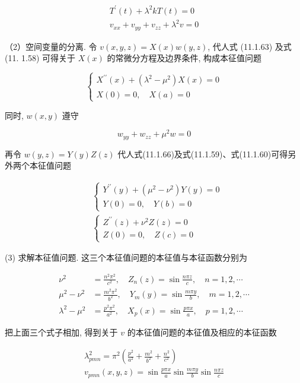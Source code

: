 $$
\begin{gathered}
T^{\prime}(t)+\lambda^{2} k T(t)=0 \\
v_{x x}+v_{y y}+v_{z z}+\lambda^{2} v=0
\end{gathered}
$$

（2）空间变量的分离. 令 $v(x, y, z)=X(x) w(y, z)$, 代人式 (11.1.63) 及式 (11. 1.58) 可得关于 $X(x)$ 的常微分方程及边界条件, 构成本征值问题

$$
\left\{\begin{array}{l}
X^{\prime \prime}(x)+\left(\lambda^{2}-\mu^{2}\right) X(x)=0 \\
X(0)=0, \quad X(a)=0
\end{array}\right.
$$

同时, $w(x, y)$ 遵守

$$
w_{y y}+w_{z z}+\mu^{2} w=0
$$

再令 $w(y, z)=Y(y) Z(z)$ 代人式(11.1.66)及式(11.1.59)、式(11.1.60)可得另外两个本征值问题

$$
\begin{aligned}
& \left\{\begin{array}{l}
Y^{\prime \prime}(y)+\left(\mu^{2}-\nu^{2}\right) Y(y)=0 \\
Y(0)=0, \quad Y(b)=0
\end{array}\right. \\
& \left\{\begin{array}{l}
Z^{\prime \prime}(z)+\nu^{2} Z(z)=0 \\
Z(0)=0, \quad Z(c)=0
\end{array}\right.
\end{aligned}
$$

(3) 求解本征值问题. 这三个本征值问题的本征值与本征函数分别为

$$
\begin{aligned}
\nu^{2} & =\frac{n^{2} \pi^{2}}{c^{2}}, \quad Z_{n}(z)=\sin \frac{n \pi z}{c}, \quad n=1,2, \cdots \\
\mu^{2}-\nu^{2} & =\frac{m^{2} \pi^{2}}{b^{2}}, \quad Y_{m}(y)=\sin \frac{m \pi y}{b}, \quad m=1,2, \cdots \\
\lambda^{2}-\mu^{2} & =\frac{p^{2} \pi^{2}}{a^{2}}, \quad X_{p}(x)=\sin \frac{p \pi x}{a}, \quad p=1,2, \cdots
\end{aligned}
$$

把上面三个式子相加, 得到关于 $v$ 的本征值问题的本征值及相应的本征函数

$$
\begin{gathered}
\lambda_{p m n}^{2}=\pi^{2}\left(\frac{p^{2}}{a^{2}}+\frac{m^{2}}{b^{2}}+\frac{n^{2}}{c^{2}}\right) \\
v_{p m n}(x, y, z)=\sin \frac{p \pi x}{a} \sin \frac{m \pi y}{b} \sin \frac{n \pi z}{c}
\end{gathered}
$$

